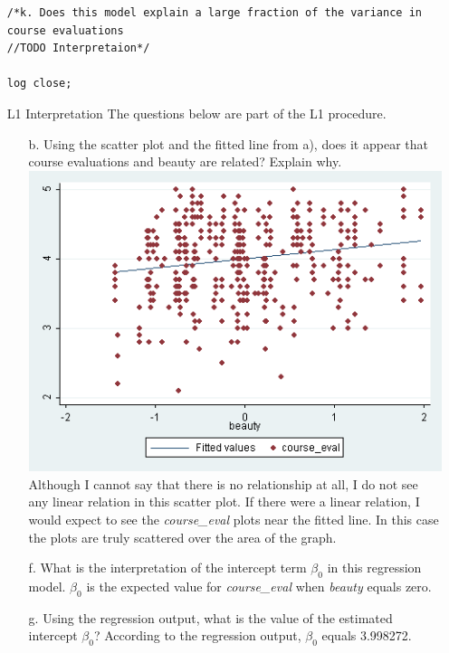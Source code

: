\documentclass{article}
\begin{document}
\begin{enumerate}
{\begin{verbatim}
/*k. Does this model explain a large fraction of the variance in course evaluations 
//TODO Interpretaion*/

log close;

\end{verbatim}
}
\newpage
\item[L1 Interpretation] The questions below are part of the L1 procedure.
\begin{enumerate}
\item[b.] Using the scatter plot and the fitted line from a), does it appear that course evaluations and beauty are related? Explain why.
\newline\newline
\includegraphics{scattereval_beauty}
\newline\newline
{Although I cannot say that there is no relationship at all, I do not see any linear relation in this scatter plot.  If there were a linear relation, I would expect to see the {\it{course\_eval}} plots near the fitted line.  In this case the plots are truly scattered over the area of the graph.}
\item[f.] What is the interpretation of the intercept term $\beta_0$ in this regression model.
\newline\newline
$\beta_0$ is the expected value for {\it{course\_eval}} when {\it{beauty}} equals zero.  
\item[g.]Using the regression output, what is the value of the estimated intercept $\beta_0$?
\newline\newline
According to the regression output, $\beta_0$ equals 3.998272.

\end{enumerate}
\end{enumerate}
\end{document}
